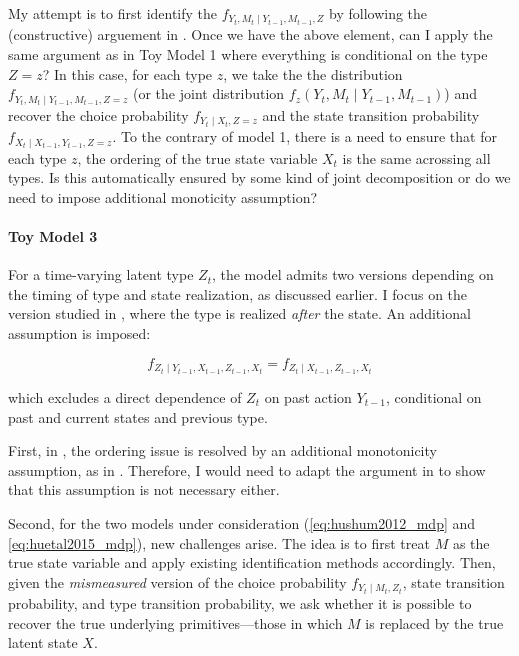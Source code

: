 \documentclass[12pt]{article}
\begin{document}
My attempt is to first identify the
$f_{Y_t, M_t\mid Y_{t-1}, M_{t-1}, Z}$ by following the (constructive) arguement in \citet{higgins2023identification}. Once we have the above element, can I apply the same argument as in Toy Model 1 where everything is conditional on the type $Z=z$? In this case, for each type $z$, we take the the distribution $f_{Y_t, M_t\mid Y_{t-1}, M_{t-1}, Z=z}$ (or the joint distribution $f_z(Y_t, M_t\mid Y_{t-1}, M_{t-1})$) and recover the choice probability $f_{Y_t\mid X_t, Z=z}$ and the state transition probability $f_{X_t\mid X_{t-1}, Y_{t-1}, Z=z}$. To the contrary of model 1, there is a need to ensure that for each type $z$, the ordering of the true state variable $X_t$ is the same acrossing all types. Is this automatically ensured by some kind of joint decomposition or do we need to impose additional monoticity assumption?

\paragraph{Toy Model 3}
For a time-varying latent type $Z_t$, the model admits two versions depending on the timing of type and state realization, as discussed earlier. I focus on the version studied in \citet{hu2017simple}, where the type is realized \emph{after} the state. An additional assumption is imposed:

$$
    f_{Z_t \mid Y_{t-1}, X_{t-1}, Z_{t-1}, X_t} = f_{Z_t \mid X_{t-1}, Z_{t-1}, X_t}
$$

which excludes a direct dependence of $Z_t$ on past action $Y_{t-1}$, conditional on past and current states and previous type.

First, in \citet{hu2017simple}, the ordering issue is resolved by an additional monotonicity assumption, as in \citet{hu2012nonparametric}. Therefore, I would need to adapt the argument in \citet{higgins2024learning} to show that this assumption is not necessary either.

Second, for the two models under consideration (\ref{eq:hushum2012_mdp} and \ref{eq:huetal2015_mdp}), new challenges arise. The idea is to first treat \( M \) as the true state variable and apply existing identification methods accordingly. Then, given the \textit{mismeasured} version of the choice probability \( f_{Y_t \mid M_t, Z_t} \), state transition probability, and type transition probability, we ask whether it is possible to recover the true underlying primitives—those in which \( M \) is replaced by the true latent state \( X \).
\end{document}

